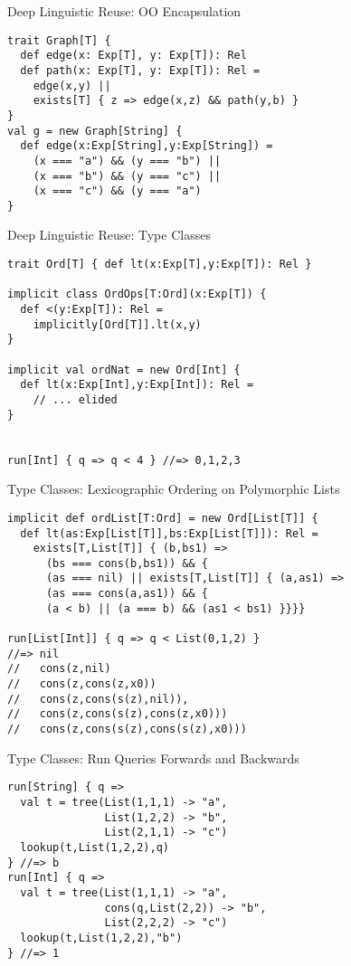 \documentclass{beamer}
\begin{document}
\begin{frame}[fragile]{Deep Linguistic Reuse: OO Encapsulation}
\begin{verbatim}
trait Graph[T] {
  def edge(x: Exp[T], y: Exp[T]): Rel
  def path(x: Exp[T], y: Exp[T]): Rel =
    edge(x,y) ||
    exists[T] { z => edge(x,z) && path(y,b) }
}
val g = new Graph[String] {
  def edge(x:Exp[String],y:Exp[String]) =
    (x === "a") && (y === "b") ||
    (x === "b") && (y === "c") ||
    (x === "c") && (y === "a")
}
\end{verbatim}
\end{frame}

\begin{frame}[fragile]{Deep Linguistic Reuse: Type Classes}
\begin{verbatim}
trait Ord[T] { def lt(x:Exp[T],y:Exp[T]): Rel }

implicit class OrdOps[T:Ord](x:Exp[T]) {
  def <(y:Exp[T]): Rel =
    implicitly[Ord[T]].lt(x,y)
}

implicit val ordNat = new Ord[Int] {
  def lt(x:Exp[Int],y:Exp[Int]): Rel =
    // ... elided
}


run[Int] { q => q < 4 } //=> 0,1,2,3
\end{verbatim}
\end{frame}

\begin{frame}[fragile]{Type Classes: Lexicographic Ordering on Polymorphic Lists}
\begin{verbatim}
implicit def ordList[T:Ord] = new Ord[List[T]] {
  def lt(as:Exp[List[T]],bs:Exp[List[T]]): Rel = 
    exists[T,List[T]] { (b,bs1) => 
      (bs === cons(b,bs1)) && {
      (as === nil) || exists[T,List[T]] { (a,as1) =>
      (as === cons(a,as1)) && {
      (a < b) || (a === b) && (as1 < bs1) }}}}

run[List[Int]] { q => q < List(0,1,2) }
//=> nil
//   cons(z,nil)
//   cons(z,cons(z,x0))
//   cons(z,cons(s(z),nil)),
//   cons(z,cons(s(z),cons(z,x0)))
//   cons(z,cons(s(z),cons(s(z),x0)))
\end{verbatim}
\end{frame}

\begin{frame}[fragile]{Type Classes: Run Queries Forwards and Backwards}
\begin{verbatim}
run[String] { q =>
  val t = tree(List(1,1,1) -> "a",
               List(1,2,2) -> "b",
               List(2,1,1) -> "c")
  lookup(t,List(1,2,2),q)
} //=> b
run[Int] { q =>
  val t = tree(List(1,1,1) -> "a",
               cons(q,List(2,2)) -> "b",
               List(2,2,2) -> "c")
  lookup(t,List(1,2,2),"b")
} //=> 1
\end{verbatim}
\end{frame}
\end{document}
